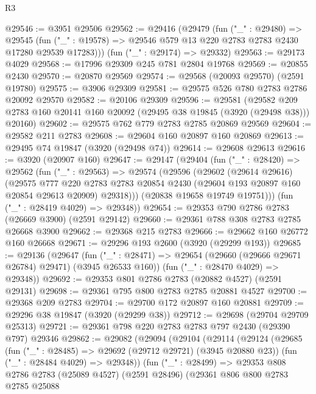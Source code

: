 \begin{lexlean}{R3}
\begin{coremodule}
@29546 := @3951 @29506
@29562 := @29416
    (@29479
      (fun ("_" : @29480) =>
      @29545 (fun ("_" : @19578) => @29546 @579 @13 @220 @2783 @2783 @2430 @17280 @29539 @17283)))
    (fun ("_" : @29174) => @29332)
@29563 := @29173 @4029
@29568 := @17996 @29309 @245 @781 @2804 @19768
@29569 := @20855 @2430
@29570 := @20870 @29569
@29574 := @29568 (@20093 @29570) (@2591 @19780)
@29575 := @3906 @29309
@29581 := @29575 @526 @780 @2783 @2786 @20092 @29570
@29582 := @20106 @29309
@29596 := @29581
    (@29582 @209 @2783 @160 @20141 @160 @20092 (@29495 @38 @19845 (@3920 (@29498 @38))) @20160)
@29602 := @29575 @762 @779 @2783 @2785 @20869 @29569
@29604 := @29582 @211 @2783
@29608 := @29604 @160 @20897 @160 @20869
@29613 := @29495 @74 @19847 (@3920 (@29498 @74))
@29614 := @29608 @29613
@29616 := @3920 (@20907 @160)
@29647 := @29147
    (@29404
      (fun ("_" : @28420) =>
      @29562
        (fun ("_" : @29563) =>
        @29574
          (@29596
            (@29602
              (@29614 @29616)
              (@29575
                @777
                @220
                @2783
                @2783
                @20854
                @2430
                (@29604 @193 @20897 @160 @20854 @29613 @20909)
                @29318)))
          (@20838 @19658 @19749 @19751)))
      (fun ("_" : @28419 @4029) => @29348))
@29654 := @29353 @790 @2786 @2783 (@26669 @3900) (@2591 @29142)
@29660 := @29361 @788 @308 @2783 @2785 @26668 @3900
@29662 := @29368 @215 @2783
@29666 := @29662 @160 @26772 @160 @26668
@29671 := @29296 @193 @2600 (@3920 (@29299 @193))
@29685 := @29136
    (@29647
      (fun ("_" : @28471) => @29654 (@29660 (@29666 @29671 @26784) @29471) (@3945 @26533 @160))
      (fun ("_" : @28470 @4029) => @29348))
@29692 := @29353 @801 @2786 @2783 (@20882 @4527) (@2591 @29131)
@29698 := @29361 @795 @800 @2783 @2785 @20881 @4527
@29700 := @29368 @209 @2783
@29704 := @29700 @172 @20897 @160 @20881
@29709 := @29296 @38 @19847 (@3920 (@29299 @38))
@29712 := @29698 (@29704 @29709 @25313)
@29721 := @29361 @798 @220 @2783 @2783 @797 @2430 (@29390 @797) @29346
@29862 := @29082
    (@29094
      (@29104
        (@29114
          (@29124
            (@29685
              (fun ("_" : @28485) => @29692 (@29712 @29721) (@3945 @20880 @23))
              (fun ("_" : @28484 @4029) => @29348))
            (fun ("_" : @28499) =>
            @29353
              @808
              @2786
              @2783
              (@25089 @4527)
              (@2591 @28496)
              (@29361
                @806
                @800
                @2783
                @2785
                @25088

\end{coremodule}
\end{lexlean}
